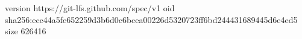 version https://git-lfs.github.com/spec/v1
oid sha256:ecc44a5fe652259d3b6d0c6bcea00226d5320723ff6bd244431689445d6e4ed5
size 626416

